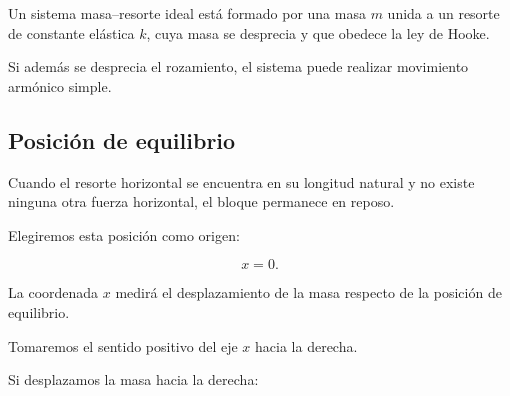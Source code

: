 \begin{modelo}
Un sistema masa--resorte ideal está formado por una masa \(m\) unida a un resorte de constante elástica \(k\), cuya masa se desprecia y que obedece la ley de Hooke.

Si además se desprecia el rozamiento, el sistema puede realizar movimiento armónico simple.
\end{modelo}


\subsection{Posición de equilibrio}

Cuando el resorte horizontal se encuentra en su longitud natural y no existe ninguna otra fuerza horizontal, el bloque permanece en reposo.

Elegiremos esta posición como origen:

\[ x=0. \]

La coordenada \(x\) medirá el desplazamiento de la masa respecto de la posición de equilibrio.

Tomaremos el sentido positivo del eje \(x\) hacia la derecha.

\begin{center}
\end{center}

Si desplazamos la masa hacia la derecha:

